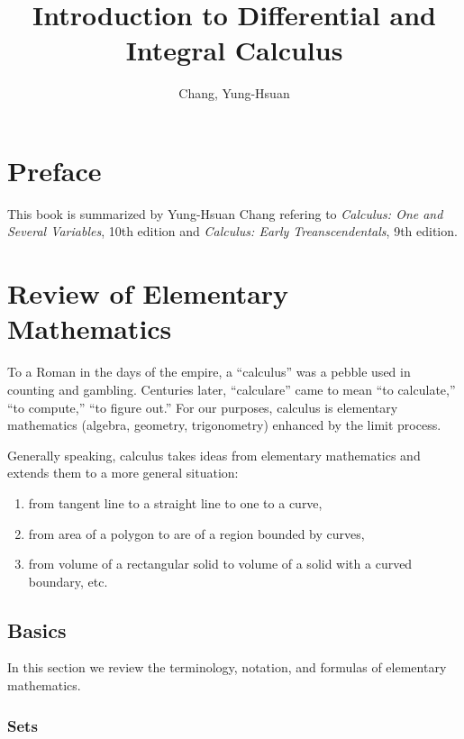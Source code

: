 \documentclass[11pt]{book}
\title{\textbf{Introduction to Differential and Integral Calculus}}
\author{Chang, Yung-Hsuan}
\theoremstyle{break}
\theoremstyle{no_label}
\numberwithin{equation}{section}
\begin{document}
\maketitle
\thispagestyle{empty}
\newpage
{}
\newpage
{}
{}
\tableofcontents
\newpage

{}
\chapter*{Preface}

This book is summarized by Yung-Hsuan Chang refering to \emph{Calculus: One and Several Variables}, 10th edition and \emph{Calculus: Early Treanscendentals}, 9th edition.

\newpage
{}

\chapter{Review of Elementary Mathematics}

To a Roman in the days of the empire, a “calculus” was a pebble used in counting and gambling. Centuries later, “calculare” came to mean “to calculate,” “to compute,” “to figure out.” For our purposes, calculus is elementary mathematics (algebra, geometry, trigonometry) enhanced by the limit process.

Generally speaking, calculus takes ideas from elementary mathematics and extends them to a more general situation: 
\begin{enumerate}
    \item from tangent line to a straight line to one to a curve,
    \item from area of a polygon to are of a region bounded by curves,
    \item from volume of a rectangular solid to volume of a solid with a curved boundary, etc.
\end{enumerate}

\section{Basics}

In this section we review the terminology, notation, and formulas of elementary mathematics.

\subsection*{Sets}
\end{document}
